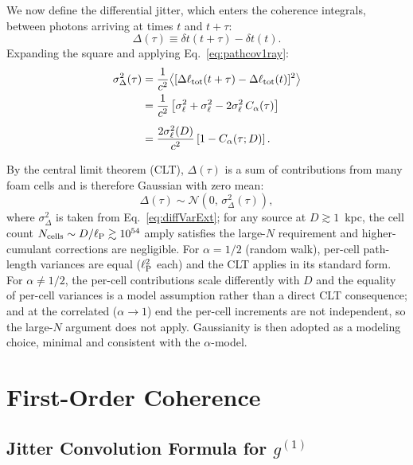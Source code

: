 \documentclass[aps,prd,onecolumn,amsmath,amssymb]{revtex4-2}
\begin{document}
We now define the differential jitter, which enters the coherence
integrals, between photons arriving at times $t$ and $t+\tau$:
\begin{equation}
  \Delta(\tau)
  \equiv \delta t(t+\tau) - \delta t(t).
  \label{eq:DeltaExt}
\end{equation}
Expanding the square and applying Eq.~\eqref{eq:pathcov1ray}:
\begin{align}
  \sigma_\Delta^2(\tau)
  &= \frac{1}{c^2}\big\langle
    [\Delta\ell_{\rm tot}(t+\tau)
     - \Delta\ell_{\rm tot}(t)]^2
    \big\rangle \notag \\
  &= \frac{1}{c^2}\left[
    \sigma_\ell^2 + \sigma_\ell^2
    - 2\sigma_\ell^2\,C_\alpha(\tau)
    \right] \notag \\[4pt]
  &= \frac{2\sigma_\ell^2(D)}{c^2}
    \left[1 - C_\alpha(\tau;D)\right].
  \label{eq:diffVarExt}
\end{align}

By the central limit theorem (CLT), $\Delta(\tau)$
is a sum of contributions from many foam cells and is therefore Gaussian with zero mean:
\begin{equation}
  \Delta(\tau)
  \sim \mathcal{N}\!\left(0,\,\sigma_\Delta^2(\tau)\right),
  \label{eq:kernel}
\end{equation}
where $\sigma_\Delta^2$ is taken from Eq.~\eqref{eq:diffVarExt}; for
any source at $D \gtrsim 1$~kpc, the cell count
$N_{\rm cells} \sim D/\ell_{\rm P} \gtrsim 10^{54}$ amply satisfies
the large-$N$ requirement and higher-cumulant corrections are negligible.  For $\alpha = 1/2$ (random walk), per-cell path-length variances
are equal ($\ell_{\rm P}^2$ each) and the CLT applies in its standard form.
For $\alpha \neq 1/2$, the per-cell contributions scale differently with $D$
and the equality of per-cell variances is a model assumption rather than a
direct CLT consequence; and at the correlated ($\alpha\to1$) end the
per-cell increments are not independent, so the large-$N$ argument does not
apply. Gaussianity is then adopted as a modeling choice, minimal and
consistent with the $\alpha$-model.


\section{First-Order Coherence}
\label{sec:g1}

\subsection{Jitter Convolution Formula for $g^{(1)}$}
\end{document}
